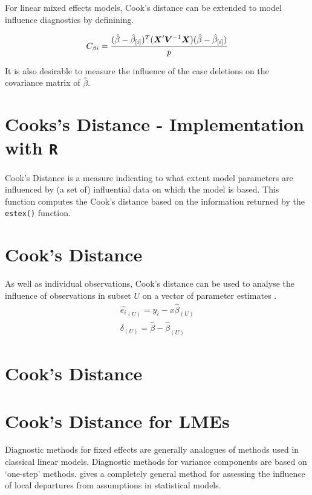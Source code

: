 \documentclass[12pt, a4paper]{article}
\begin{document}
For linear mixed effects models, Cook's distance can be extended to model influence diagnostics by definining.

\[ C_{\beta i} = {(\hat{\beta} - \hat{\beta}_{[i]})^{T}(\boldsymbol{X}^{\prime}\boldsymbol{V}^{-1}\boldsymbol{X}) (\hat{\beta} - \hat{\beta}_{[i]}) \over p}\]

It is also desirable to measure the influence of the case deletions on the covariance matrix of $\hat{\beta}$.

\section{Cooks's Distance - Implementation with \texttt{R}}
Cook's Distance is a measure indicating to what extent model parameters are influenced by (a set of) influential data on which the model is based. This function computes the Cook's distance based on the information returned by the \texttt{estex()} function.
	
	
\section{Cook's Distance}
As well as individual observations, Cook's distance can be used to analyse the influence of observations in subset $U$ on a vector of parameter estimates \citep{cook77}.
\begin{eqnarray}
	\hat{e_{i}}_{(U)} = y_{i} - x\hat{\beta}_{(U)}\\
	\delta_{(U)} = \hat{\beta} - \hat{\beta}_{(U)}
\end{eqnarray}

\section{Cook's Distance} %



\newpage
\section{Cook's Distance for LMEs} %
Diagnostic methods for fixed effects are generally analogues of methods used in classical linear models.
Diagnostic methods for variance components are based on `one-step' methods. \citet{cook86} gives a completely general method for assessing the influence of local departures from assumptions in statistical models.
\end{document}

